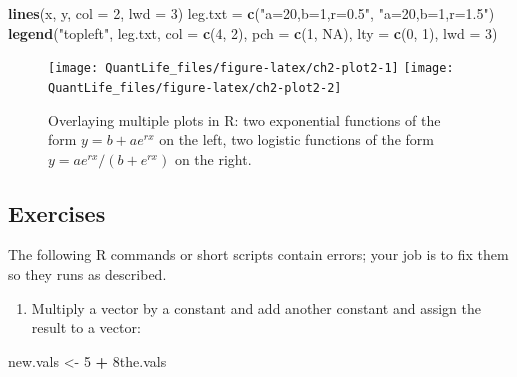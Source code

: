 \documentclass[
]{book}
\newenvironment{Shaded}{\begin{snugshade}}{\end{snugshade}}
\newcommand{\DataTypeTok}[1]{\textcolor[rgb]{0.13,0.29,0.53}{#1}}
\newcommand{\DecValTok}[1]{\textcolor[rgb]{0.00,0.00,0.81}{#1}}
\newcommand{\KeywordTok}[1]{\textcolor[rgb]{0.13,0.29,0.53}{\textbf{#1}}}
\newcommand{\NormalTok}[1]{#1}
\newcommand{\OperatorTok}[1]{\textcolor[rgb]{0.81,0.36,0.00}{\textbf{#1}}}
\newcommand{\OtherTok}[1]{\textcolor[rgb]{0.56,0.35,0.01}{#1}}
\newcommand{\StringTok}[1]{\textcolor[rgb]{0.31,0.60,0.02}{#1}}
\providecommand{\tightlist}{%
  \setlength{\itemsep}{0pt}\setlength{\parskip}{0pt}}
\theoremstyle{definition}
\theoremstyle{definition}
\theoremstyle{definition}
\theoremstyle{remark}
\begin{document}
\begin{Shaded}
\begin{Highlighting}[]
\KeywordTok{lines}\NormalTok{(x, y, }\DataTypeTok{col =} \DecValTok{2}\NormalTok{, }\DataTypeTok{lwd =} \DecValTok{3}\NormalTok{)}
\NormalTok{leg.txt =}\StringTok{ }\KeywordTok{c}\NormalTok{(}\StringTok{"a=20,b=1,r=0.5"}\NormalTok{, }\StringTok{"a=20,b=1,r=1.5"}\NormalTok{)}
\KeywordTok{legend}\NormalTok{(}\StringTok{"topleft"}\NormalTok{, leg.txt, }\DataTypeTok{col =} \KeywordTok{c}\NormalTok{(}\DecValTok{4}\NormalTok{, }\DecValTok{2}\NormalTok{), }\DataTypeTok{pch =} \KeywordTok{c}\NormalTok{(}\DecValTok{1}\NormalTok{, }\OtherTok{NA}\NormalTok{), }\DataTypeTok{lty =} \KeywordTok{c}\NormalTok{(}\DecValTok{0}\NormalTok{, }\DecValTok{1}\NormalTok{), }\DataTypeTok{lwd =} \DecValTok{3}\NormalTok{)}
\end{Highlighting}
\end{Shaded}

\begin{figure}

{\centering \texttt{[image: QuantLife\_files/figure-latex/ch2-plot2-1]} \texttt{[image: QuantLife\_files/figure-latex/ch2-plot2-2]} 

}

\caption{Overlaying multiple plots in R: two exponential functions of the form $y=b+ae^{rx}$ on the left, two logistic functions of the form $y= ae^{rx}/(b+e^{rx})$ on the right.}\label{fig:ch2-plot2}
\end{figure}

\hypertarget{exercises-5}{%
\subsection{Exercises}\label{exercises-5}}

The following R commands or short scripts contain errors; your job is to fix them so they runs as described.

\begin{enumerate}
\def\labelenumi{\arabic{enumi}.}
\tightlist
\item
  Multiply a vector by a constant and add another constant and assign the result to a vector:
\end{enumerate}

\begin{Shaded}
\begin{Highlighting}[]
\NormalTok{new.vals \textless{}{-}}\StringTok{ }\DecValTok{5} \OperatorTok{+}\StringTok{ }\NormalTok{8the.vals}
\end{Highlighting}
\end{Shaded}
\end{document}
